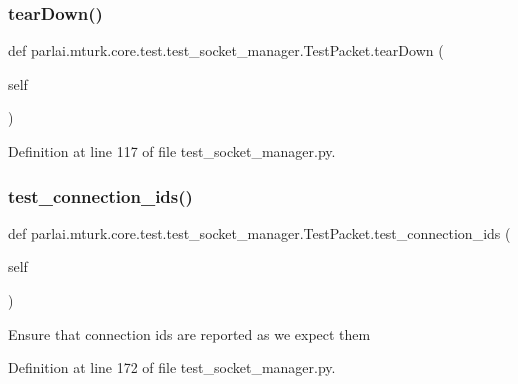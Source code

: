 \subsubsection{\texorpdfstring{tear\+Down()}{tearDown()}}
{\footnotesize\ttfamily def parlai.\+mturk.\+core.\+test.\+test\+\_\+socket\+\_\+manager.\+Test\+Packet.\+tear\+Down (\begin{DoxyParamCaption}\item[{}]{self }\end{DoxyParamCaption})}



Definition at line 117 of file test\+\_\+socket\+\_\+manager.\+py.

\mbox{\label{classparlai_1_1mturk_1_1core_1_1test_1_1test__socket__manager_1_1TestPacket_ad997a424a8ee3975bcc2cee55872777f}} 
\subsubsection{\texorpdfstring{test\+\_\+connection\+\_\+ids()}{test\_connection\_ids()}}
{\footnotesize\ttfamily def parlai.\+mturk.\+core.\+test.\+test\+\_\+socket\+\_\+manager.\+Test\+Packet.\+test\+\_\+connection\+\_\+ids (\begin{DoxyParamCaption}\item[{}]{self }\end{DoxyParamCaption})}

\begin{DoxyVerb}Ensure that connection ids are reported as we expect them\end{DoxyVerb}
 

Definition at line 172 of file test\+\_\+socket\+\_\+manager.\+py.



